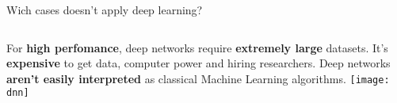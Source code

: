 
\begin{frame}[t]{Wich cases doesn't apply deep learning?} %
        \begin{columns}[c]
                        For \textbf{high perfomance}, deep networks require \textbf{extremely large} datasets.  
                        \newline
                        \newline
                        It's \textbf{expensive} to get data, computer power and hiring researchers.
                        \newline
                        \newline
                        Deep networks \textbf{aren't easily interpreted} as classical Machine Learning algorithms.
                    \texttt{[image: dnn]}
            \end{columns}
        
    
\end{frame}

